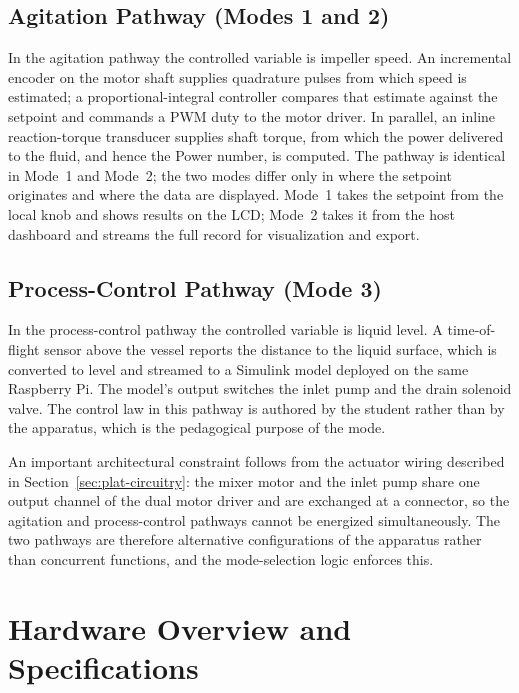 \subsection{Agitation Pathway (Modes 1 and 2)}
\label{subsec:arch-agitation}

In the agitation pathway the controlled variable is impeller speed. An incremental encoder on the motor shaft supplies quadrature pulses from which speed is estimated; a proportional-integral controller compares that estimate against the setpoint and commands a PWM duty to the motor driver. In parallel, an inline reaction-torque transducer supplies shaft torque, from which the power delivered to the fluid, and hence the Power number, is computed. The pathway is identical in Mode~1 and Mode~2; the two modes differ only in where the setpoint originates and where the data are displayed. Mode~1 takes the setpoint from the local knob and shows results on the LCD; Mode~2 takes it from the host dashboard and streams the full record for visualization and export.

\subsection{Process-Control Pathway (Mode 3)}
\label{subsec:arch-process}

In the process-control pathway the controlled variable is liquid level. A time-of-flight sensor above the vessel reports the distance to the liquid surface, which is converted to level and streamed to a Simulink model deployed on the same Raspberry Pi. The model's output switches the inlet pump and the drain solenoid valve. The control law in this pathway is authored by the student rather than by the apparatus, which is the pedagogical purpose of the mode.

An important architectural constraint follows from the actuator wiring described in Section~\ref{sec:plat-circuitry}: the mixer motor and the inlet pump share one output channel of the dual motor driver and are exchanged at a connector, so the agitation and process-control pathways cannot be energized simultaneously. The two pathways are therefore alternative configurations of the apparatus rather than concurrent functions, and the mode-selection logic enforces this.


\section{Hardware Overview and Specifications}
\label{sec:arch-hardware}

